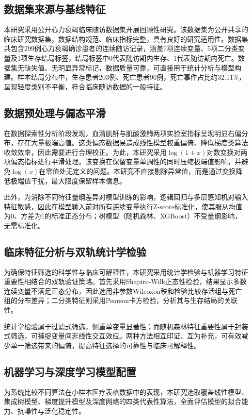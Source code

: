 \documentclass[11pt,a4paper]{ctexart} %
\begin{document}
\subsection{数据集来源与基线特征}
本研究采用公开心力衰竭临床随访数据集开展回顾性研究。该数据集为公开共享的临床研究数据集，数据结构规范、临床指标完整，具有良好的研究适用性。数据集共包含299例心力衰竭确诊患者的连续随访记录，涵盖7项连续变量、5项二分类变量及1项生存结局标签，结局标签中0代表随访期内生存、1代表随访期内死亡。数据集无缺失值、无明显异常标记，数据质量可靠，可直接用于统计分析与模型构建。样本结局分布中，生存患者203例、死亡患者96例，死亡事件占比约32.11\%，呈现轻度类别不平衡，符合临床随访数据的一般特征。

\subsection{数据预处理与偏态平滑}
在数据探索性分析阶段发现，血清肌酐与肌酸激酶两项实验室指标呈现明显右偏分布，存在大量极端高值。这类偏态数据易造成线性模型权重偏倚、降低梯度类算法收敛效率，因此需要进行合理校正。为此，本研究采用$\log(1+x)$对数变换对两项偏态指标进行平滑处理。该变换在保留变量单调性的同时压缩极端值影响，并避免$\log(x)$在零值处无定义的问题。本研究不直接剔除异常值，而是通过变换降低极端值干扰，最大限度保留样本信息。

此外，为消除不同特征量纲差异对模型训练的影响，逻辑回归与多层感知机对输入特征敏感，因此在模型输入前对所有连续变量执行Z‑score标准化，使其服从均值为0、方差为1的标准正态分布；树模型（随机森林、XGBoost）不受量纲影响，无需标准化。

\subsection{临床特征分析与双轨统计学检验}
为确保特征筛选的科学性与临床可解释性，本研究采用统计学检验与机器学习特征重要性相结合的双轨验证策略。首先采用Shapiro‑Wilk正态性检验，结果显示多数连续变量不满足正态分布，因此选用非参数Wilcoxon秩和检验比较存活组与死亡组的分布差异；二分类特征则采用Pearson卡方检验，分析其与生存结局的关联性。

统计学检验属于过滤式筛选，侧重单变量显著性；而随机森林特征重要性属于封装式筛选，可捕捉变量间非线性交互效应。两种方法相互印证、互为补充，可有效减少单一筛选带来的偏倚，提高特征选择的可靠性与临床可解释性。

\subsection{机器学习与深度学习模型配置}
为系统比较不同算法在小样本医疗表格数据中的表现，本研究选取覆盖线性模型、集成树模型、梯度提升模型及深度网络的四类代表性算法，全面评估模型的拟合能力、抗噪性与泛化稳定性。
\end{document}
